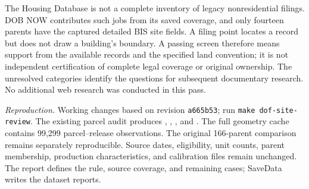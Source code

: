 The Housing Database is not a complete inventory of legacy nonresidential
filings. DOB NOW contributes such jobs from its saved coverage, and only
fourteen parents have the captured detailed BIS site fields. A filing point
locates a record but does not draw a building's boundary. A passing screen
therefore means support from the available records and the specified land
convention; it is not independent certification of complete legal coverage or
original ownership. The unresolved categories identify the questions for
subsequent documentary research. No additional web research was conducted in
this pass.

\textit{Reproduction.} Working changes based on revision \texttt{a665b53};
run \texttt{make dof-site-review}. The existing parcel audit produces
, ,
, and
. The full geometry cache contains
99,299 parcel--release observations. The original 166-parent comparison
remains separately reproducible. Source dates, eligibility, unit counts,
parent membership, production characteristics, and calibration files remain
unchanged. The report  defines the rule,
source coverage, and remaining cases; SaveData writes the dataset reports.
